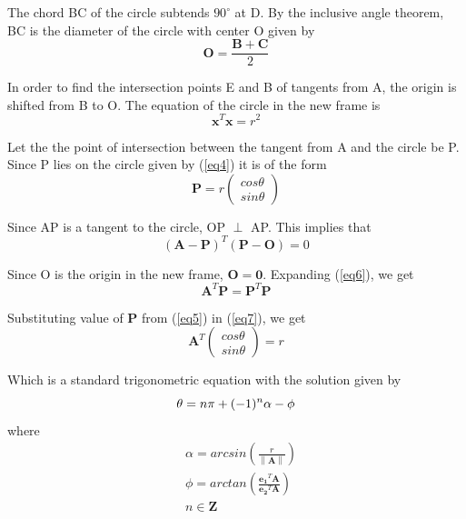 \documentclass[journal,10pt,twocolumn]{article}
\providecommand{\norm}[1]{\left\lVert#1\right\rVert}
\let\vec\mathbf
\newcommand{\myvec}[1]{\ensuremath{\begin{pmatrix}#1\end{pmatrix}}}
\begin{document}
The chord BC of the circle subtends $90^\circ$ at D. By the inclusive angle theorem, BC is the diameter of the circle with center O given by
\begin{equation}
\vec{O} = \frac{\vec{B}+\vec{C}}{2}
\label{eq3}
\end{equation}

In order to find the intersection points E and B of tangents from A, the origin is shifted from B to O. The equation of the circle in the new frame is
\begin{equation}
	\vec{x}^T\vec{x} = r^2
	\label{eq4}
\end{equation}

Let the the point of intersection between the tangent from A and the circle be P. Since P lies on the circle given by (\ref{eq4}) it is of the form    
\begin{equation}
	\vec{P} = r\myvec{cos\theta\\sin\theta}
	\label{eq5}
\end{equation}

Since AP is a tangent to the circle, OP $\perp$ AP. This implies that
\begin{equation}
	(\vec{A}-\vec{P})^T(\vec{P}-\vec{O}) = 0
	\label{eq6}
\end{equation}

Since O is the origin in the new frame, $\vec{O} = \vec{0}$. Expanding (\ref{eq6}), we get 
\begin{equation}
	\vec{A}^T\vec{P} = \vec{P}^T\vec{P}
	\label{eq7}
\end{equation}

Substituting value of $\vec{P}$ from (\ref{eq5}) in (\ref{eq7}), we get
\begin{equation}
	\vec{A}^T\myvec{cos\theta\\sin\theta} = r	
	\label{eq8}
\end{equation}

Which is a standard trigonometric equation with the solution given by
\begin{equation}
\theta = n\pi + (-1)^n\alpha - \phi\\
\label{eq9}
\end{equation}
where
\begin{align*}
	&\alpha = arcsin(\frac{r}{\norm{\vec{A}}})\\
	&\phi = arctan(\frac{\vec{e_1}^T\vec{A}}{\vec{e_2}^T\vec{A}})\\
	&n \in \mathbf{Z}
\end{align*}
\end{document}
